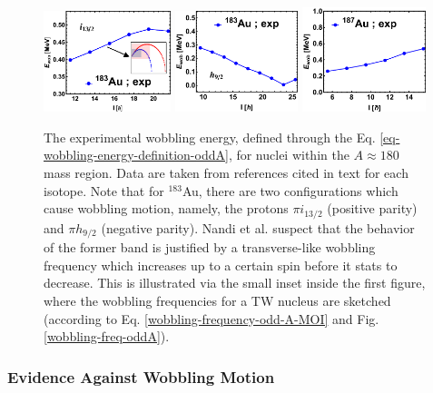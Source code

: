 \begin{figure}
    \centering
    \includegraphics[width=0.33\textwidth]{Chapters/Figures/wobblers/183Au_2-edited.pdf}
    \includegraphics[width=0.32\textwidth]{Chapters/Figures/wobblers/183Au_1.pdf}
    \includegraphics[width=0.32\textwidth]{Chapters/Figures/wobblers/187Au.pdf}
    \caption{The experimental wobbling energy, defined through the Eq. \ref{eq-wobbling-energy-definition-oddA}, for nuclei within the $A\approx 180$ mass region. Data are taken from references cited in text for each isotope. Note that for $^{183}$Au, there are two configurations which cause wobbling motion, namely, the protons $\pi i_{13/2}$ (positive parity) and $\pi h_{9/2}$ (negative parity). Nandi et al. \cite{nandi2020first} suspect that the behavior of the former band is justified by a transverse-like wobbling frequency which increases up to a certain spin before it stats to decrease. This is illustrated via the small inset inside the first figure, where the wobbling frequencies for a TW nucleus are sketched (according to Eq. \ref{wobbling-frequency-odd-A-MOI} and Fig. \ref{wobbling-freq-oddA}).}
    \label{wobblers-exp-set4}
\end{figure}

\subsubsection*{Evidence Against Wobbling Motion}

